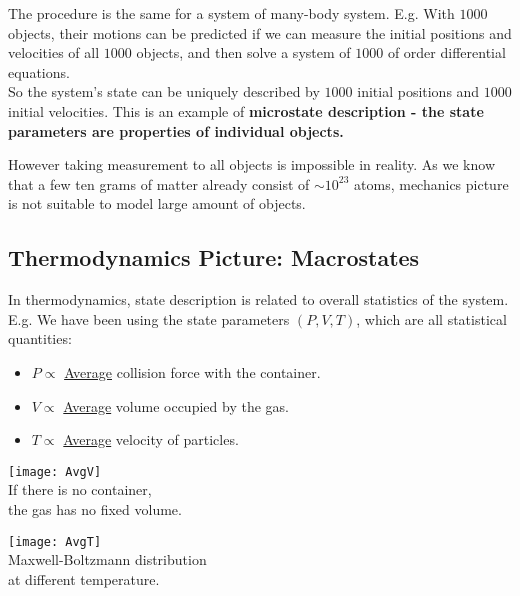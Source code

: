 \documentclass[class=article, crop=false, 12pt]{standalone}
\begin{document}
The procedure is the same for a system of many-body system. 
E.g. With $1000$ objects, 
their motions can be predicted if we can measure the initial positions and velocities of all $1000$ objects, 
and then solve a system of $1000$ of  order differential equations.\\

So the system's state can be uniquely described by $1000$ initial positions and $1000$ initial velocities.
This is an example of \bf{microstate description} - 
the state parameters are properties of individual objects.

However taking measurement to all objects is impossible in reality. 
As we know that a few ten grams of matter already consist of $\sim 10^{23}$ atoms, 
mechanics picture is not suitable to model large amount of objects.


\subsection{Thermodynamics Picture: Macrostates}

In thermodynamics,
state description is related to overall statistics of the system.
E.g. We have been using the state parameters $(P,V,T)$, which are all statistical quantities:
\begin{itemize}
    \item $P \propto$ \ul{Average} collision force with the container.
    \item $V \propto$ \ul{Average} volume occupied by the gas.
    \item $T \propto$ \ul{Average} velocity of particles. 
\end{itemize}

\begin{center}
    \begin{minipage}{0.4\linewidth}
        \centering
        \texttt{[image: AvgV]}\\
        If there is no container,\\
        the gas has no fixed volume.
    \end{minipage}
    \hspace{0.05\textwidth}
    \begin{minipage}{0.4\linewidth}
        \centering
        \texttt{[image: AvgT]}\\
        Maxwell-Boltzmann distribution\\
        at different temperature.
    \end{minipage}
\end{center}
\end{document}
